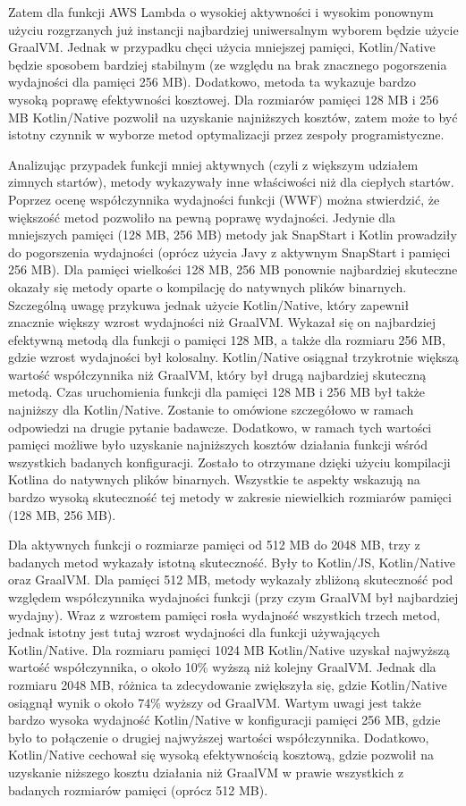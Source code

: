 Zatem dla funkcji AWS Lambda o wysokiej aktywności i wysokim ponownym użyciu rozgrzanych już instancji najbardziej uniwersalnym wyborem będzie użycie GraalVM.
Jednak w przypadku chęci użycia mniejszej pamięci, Kotlin/Native będzie sposobem bardziej stabilnym (ze względu na brak znacznego pogorszenia wydajności dla pamięci 256 MB).
Dodatkowo, metoda ta wykazuje bardzo wysoką poprawę efektywności kosztowej.
Dla rozmiarów pamięci 128 MB i 256 MB Kotlin/Native pozwolił na uzyskanie najniższych kosztów, zatem może to być istotny czynnik w wyborze metod optymalizacji przez zespoły programistyczne.

Analizując przypadek funkcji mniej aktywnych (czyli z większym udziałem zimnych startów), metody wykazywały inne właściwości niż dla ciepłych startów.
Poprzez ocenę współczynnika wydajności funkcji (WWF) można stwierdzić, że większość metod pozwoliło na pewną poprawę wydajności.
Jedynie dla mniejszych pamięci (128 MB, 256 MB) metody jak SnapStart i Kotlin prowadziły do pogorszenia wydajności (oprócz użycia Javy z aktywnym SnapStart i pamięci 256 MB).
Dla pamięci wielkości 128 MB, 256 MB ponownie najbardziej skuteczne okazały się metody oparte o kompilację do natywnych plików binarnych.
Szczególną uwagę przykuwa jednak użycie Kotlin/Native, który zapewnił znacznie większy wzrost wydajności niż GraalVM.
Wykazał się on najbardziej efektywną metodą dla funkcji o pamięci 128 MB, a także dla rozmiaru 256 MB, gdzie wzrost wydajności był kolosalny.
Kotlin/Native osiągnał trzykrotnie większą wartość współczynnika niż GraalVM, który był drugą najbardziej skuteczną metodą.
Czas uruchomienia funkcji dla pamięci 128 MB i 256 MB był także najniższy dla Kotlin/Native.
Zostanie to omówione szczegółowo w ramach odpowiedzi na drugie pytanie badawcze.
Dodatkowo, w ramach tych wartości pamięci możliwe było uzyskanie najniższych kosztów działania funkcji wśród wszystkich badanych konfiguracji.
Zostało to otrzymane dzięki użyciu kompilacji Kotlina do natywnych plików binarnych.
Wszystkie te aspekty wskazują na bardzo wysoką skuteczność tej metody w zakresie niewielkich rozmiarów pamięci (128 MB, 256 MB).

Dla aktywnych funkcji o rozmiarze pamięci od 512 MB do 2048 MB, trzy z badanych metod wykazały istotną skuteczność.
Były to Kotlin/JS, Kotlin/Native oraz GraalVM.
Dla pamięci 512 MB, metody wykazały zbliżoną skuteczność pod względem współczynnika wydajności funkcji (przy czym GraalVM był najbardziej wydajny).
Wraz z wzrostem pamięci rosła wydajność wszystkich trzech metod, jednak istotny jest tutaj wzrost wydajności dla funkcji używających Kotlin/Native.
Dla rozmiaru pamięci 1024 MB Kotlin/Native uzyskał najwyższą wartość współczynnika, o około 10\% wyższą niż kolejny GraalVM.
Jednak dla rozmiaru 2048 MB, różnica ta zdecydowanie zwiększyła się, gdzie Kotlin/Native osiągnął wynik o około 74\% wyższy od GraalVM.
Wartym uwagi jest także bardzo wysoka wydajność Kotlin/Native w konfiguracji pamięci 256 MB, gdzie było to połączenie o drugiej najwyższej wartości współczynnika.
Dodatkowo, Kotlin/Native cechował się wysoką efektywnością kosztową, gdzie pozwolił na uzyskanie niższego kosztu działania niż GraalVM w prawie wszystkich z badanych rozmiarów pamięci (oprócz 512 MB).


